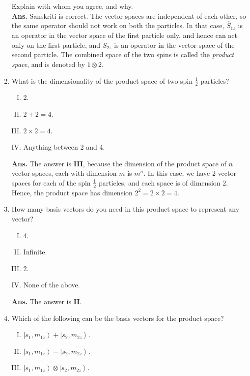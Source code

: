 \documentclass[12pt]{article}
\begin{document}
\begin{enumerate}[1.]
Explain with whom you agree, and why. \\ \newline
\textbf{Ans.} Sanskriti is correct. The vector spaces are independent of each other, so the same operator should not work on both the particles. In that case, $\hat{S}_{1z}$ is an operator in the vector space of the first particle only, and hence can act only on the first particle, and $\hat{S}_{2z}$ is an operator in the vector space of the second particle. The combined space of the two spins is called the \emph{product space}, and is denoted by $ 1 \otimes 2$. 
\item What is the dimensionality of the product space of two spin $\frac{1}{2}$ particles?
       \begin{enumerate}[I.]
              \item 2.
              \item $2+2=4$.
              \item $2 \times 2 = 4$.
              \item Anything between 2 and 4.
       \end{enumerate}
\textbf{Ans.} The answer is \textbf{III}, because the dimension of the product space of $n$ vector spaces, each with dimension $m$ is $m^n$. In this case, we have 2 vector spaces for each of the spin $\frac{1}{2}$ particles, and each space is of dimension 2. Hence, the product space has dimension $2^2=2\times 2=4$.
\newpage
\item How many basis vectors do you need in this product space to represent any vector?
       \begin{enumerate}[I.]
              \item 4.
              \item Infinite.
              \item 2.
              \item None of the above.
       \end{enumerate}
\textbf{Ans.} The answer is \textbf{II}.
\item Which of the following can be the basis vectors for the product space?
       \begin{enumerate}[I.]
              \item $\left | s_1, m_{1z} \right \rangle + \left | s_2, m_{2z} \right \rangle$.
              \item $\left | s_1, m_{1z} \right \rangle -\left | s_2, m_{2z} \right \rangle$.
              \item $\left | s_1, m_{1z} \right \rangle \otimes \left | s_2, m_{2z} \right \rangle$.

\end{enumerate}
\end{enumerate}
\end{document}
